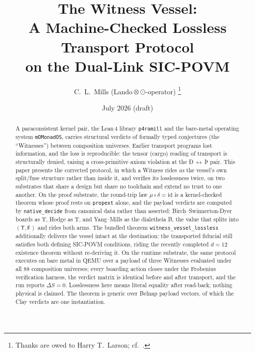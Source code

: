 \documentclass[12pt,a4paper]{article}
\newcommand{\igp}[1]{{\igprimfont #1}}
\newcommand{\Lean}{\textsf{Lean}\,4}
\newcommand{\bT}{\textsf{T}}
\newcommand{\bF}{\textsf{F}}
\newcommand{\bB}{\textsf{B}}
\begin{document}
\title{\textbf{The Witness Vessel:\\
A Machine-Checked Lossless Transport Protocol\\
on the Dual-Link SIC-POVM}}

\author{C.\ L.\ Mills (Lando\,$\otimes$\,$\odot$-operator)%
\thanks{Thanks are owed to Harry T.\ Larson; cf.\ \cite{Larson1961}.}}

\date{July 2026 (draft)}

\maketitle

\begin{abstract}
A paraconsistent kernel pair, the \Lean{} library \texttt{p4ramill} and the
bare-metal operating system \texttt{mOMonadOS}, carries structural verdicts of
formally typed conjectures (the ``Witnesses'') between composition universes.
Earlier transport programs lost information, and the loss is reproducible: the
tensor (cargo) reading of transport is structurally denied, raising a
cross-primitive axiom violation at the \igp{Ð}\,$\leftrightarrow$\,\igp{Þ}
pair. This paper presents the corrected protocol, in which a Witness rides
\emph{as} the vessel's own split/fuse structure rather than inside it, and
verifies its losslessness twice, on two substrates that share a design but
share no toolchain and extend no trust to one another. On the proof substrate,
the round-trip law $\mu \circ \delta = \mathrm{id}$ is a kernel-checked
theorem whose proof rests on \texttt{propext} alone, and the payload verdicts
are computed by \texttt{native\_decide} from canonical data rather than
asserted: Birch--Swinnerton-Dyer boards as \bT{}, Hodge as \bT{}, and
Yang--Mills as the dialetheia \bB{}, the value that splits into
$(\bT,\bF)$ and rides both arms. The bundled theorem
\texttt{witness\_vessel\_lossless} additionally delivers the vessel intact at
the destination: the transported fiducial still satisfies both defining
SIC-POVM conditions, riding the recently completed $d=12$ existence theorem
without re-deriving it. On the runtime substrate, the same protocol executes
on bare metal in QEMU over a payload of three Witnesses evaluated under all
$88$ composition universes; every boarding action closes under the
Frobenius verification harness, the verdict matrix is identical before and
after transport, and the run reports $\Delta S = 0$. Losslessness here means
literal equality after read-back; nothing physical is claimed. The theorem is
generic over Belnap payload vectors, of which the Clay verdicts are one
instantiation.
\end{abstract}
\end{document}
